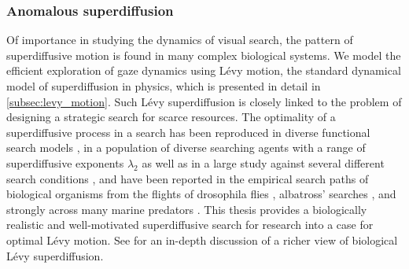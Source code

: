 \subsubsection*{Anomalous superdiffusion}\label{subsubsec:anomalous_superdiffusion}
Of importance in studying the dynamics of visual search, the pattern of superdiffusive motion is found in many complex biological systems. We model the efficient exploration of gaze dynamics using Lévy motion, the standard dynamical model of superdiffusion in physics, which is presented in detail in \cref{subsec:levy_motion}. Such Lévy superdiffusion is closely linked to the problem of designing a strategic search for scarce resources. The optimality of a superdiffusive process in a search has been reproduced in diverse functional search models \cite{humphries_optimal_2014, campeau_evolutionary_2022, sims_optimal_2019}, in a population of diverse searching agents with a range of superdiffusive exponents $\lambda_2$ \cite{clementi_search_2021} as well as in a large study against several different search conditions \cite{humphries_optimal_2014}, and have been reported in the empirical search paths of biological organisms from the flights of drosophila flies \cite{sims_optimal_2019, reynolds_free-flight_2007}, albatross' searches \cite{focardi_levy_2014, humphries_new_2013}, and strongly across many marine predators \cite{sims_scaling_2008, humphries_environmental_2010}. This thesis provides a biologically realistic and well-motivated superdiffusive search for research into a case for optimal Lévy motion. See \textcite{reynolds_liberating_2015} for an in-depth discussion of a richer view of biological Lévy superdiffusion.

